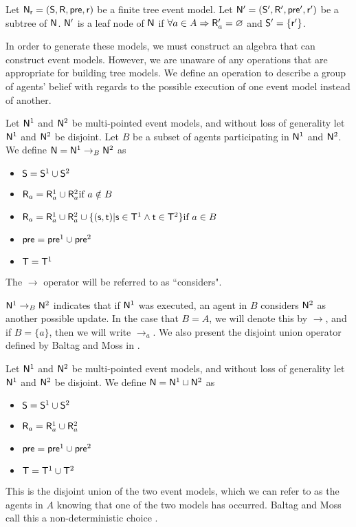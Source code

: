 \begin{defn} \label{leaf}
Let $\mathrm{\mathsf{N}}_\mathrm{\mathsf{r}} = (\mathrm{\mathsf{S}}, \mathrm{\mathsf{R}}, \mathrm{\mathsf{pre}}, \mathrm{\mathsf{r}})$ be a finite tree event model.
Let $\mathrm{\mathsf{N}}' = (\mathrm{\mathsf{S}}', \mathrm{\mathsf{R}}', \mathrm{\mathsf{pre}}', \mathrm{\mathsf{r}}')$ be a subtree of $\mathrm{\mathsf{N}}$.
$\mathrm{\mathsf{N}}'$ is a leaf node of $\mathrm{\mathsf{N}}$ if $\forall a \in A \Rightarrow \mathrm{\mathsf{R}}'_a = \varnothing$ and $\mathrm{\mathsf{S}}' = \{
\mathrm{\mathsf{r}}'\}$.
\end{defn}

In order to generate these models, we must construct an algebra that can construct event models.
However, we are unaware of any operations that are appropriate for building tree models.
We define an operation to describe a group of agents' belief with regards to the possible execution
of one event model instead of another.

\begin{defn} \label{considers}
Let $\mathrm{\mathsf{N}}^1$ and $\mathrm{\mathsf{N}}^2$ be multi-pointed event models, and without loss of
generality let $\mathrm{\mathsf{N}}^1$ and $\mathrm{\mathsf{N}}^2$ be disjoint.
Let $B$ be a subset of agents participating in $\mathrm{\mathsf{N}}^1$ and $\mathrm{\mathsf{N}}^2$.
We define $\mathrm{\mathsf{N}} = \mathrm{\mathsf{N}}^1 \to_B \mathrm{\mathsf{N}}^2$ as 
\begin{itemize}
  \item $\mathrm{\mathsf{S}} = \mathrm{\mathsf{S}}^1 \cup \mathrm{\mathsf{S}}^2$
  \item $\mathrm{\mathsf{R}}_a = \mathrm{\mathsf{R}}^1_a \cup \mathrm{\mathsf{R}}^2_a \text{if } a \notin B$
	\item $\mathrm{\mathsf{R}}_a =
      \mathrm{\mathsf{R}}^1_a \cup
      \mathrm{\mathsf{R}}^2_a \cup
      \{(\mathrm{\mathsf{s}},\mathrm{\mathsf{t}}) | \mathrm{\mathsf{s}} \in \mathrm{\mathsf{T}}^1 \land \mathrm{\mathsf{t}} \in \mathrm{\mathsf{T}}^2 \}
    \text{if } a \in B $
  \item $\mathrm{\mathsf{pre}} = \mathrm{\mathsf{pre}}^1 \cup \mathrm{\mathsf{pre}}^2$
  \item $\mathrm{\mathsf{T}} = \mathrm{\mathsf{T}}^1$
\end{itemize}
The $\to$ operator will be referred to as ``considers".
\end{defn}

$\mathrm{\mathsf{N}}^1 \to_B \mathrm{\mathsf{N}}^2$ indicates that if $\mathrm{\mathsf{N}}^1$ was executed, an agent in $B$ considers $\mathrm{\mathsf{N}}^2$ as another
possible update.
In the case that $B = A$, we will denote this by $\to$, and if $B = \{a\}$, then
we will write $\to_a$.
We also present the disjoint union operator defined by Baltag and Moss in \cite{baltag2005programs}.

\begin{defn} \label{disjoint}
Let $\mathrm{\mathsf{N}}^1$ and $\mathrm{\mathsf{N}}^2$ be multi-pointed event models, and without loss of generality let $\mathrm{\mathsf{N}}^1$ and
$\mathrm{\mathsf{N}}^2$ be disjoint.
We define $\mathrm{\mathsf{N}} = \mathrm{\mathsf{N}}^1 \sqcup \mathrm{\mathsf{N}}^2$ as
\begin{itemize}
	\item $\mathrm{\mathsf{S}} = \mathrm{\mathsf{S}}^1 \cup \mathrm{\mathsf{S}}^2$
	\item $\mathrm{\mathsf{R}}_a = \mathrm{\mathsf{R}}^1_a \cup \mathrm{\mathsf{R}}^2_a$
	\item $\mathrm{\mathsf{pre}} = \mathrm{\mathsf{pre}}^1 \cup \mathrm{\mathsf{pre}}^2$
	\item $\mathrm{\mathsf{T}} = \mathrm{\mathsf{T}}^1 \cup \mathrm{\mathsf{T}}^2$
\end{itemize}
\end{defn}
This is the disjoint union of the two event models, which we can refer to as the agents in $A$
knowing that one of the two models has occurred.
Baltag and Moss call this a non-deterministic choice \cite{baltag2005programs}.

